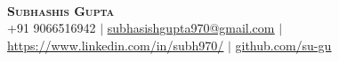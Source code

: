 \documentclass[A4,11pt]{article}
\begin{document}
\begin{comment}
In Europe it is common to include a picture of ones self in the CV. Select
which heading appropriate for the document you are creating.
\end{comment}

\begin{minipage}[c]{0.05\textwidth}
\-\
\end{minipage}
\begin{minipage}[c]{0.2\textwidth}
\hfill\vline\hfill
\end{minipage}


\begin{center}
    \textbf{\Huge \scshape Subhashis Gupta} \\ \vspace{0.5pt} %
    \small +91 9066516942 $|$ 
    \href{mailto:subhasishgupta970@gmail.com}{\underline{subhasishgupta970@gmail.com}} $|$\\
    \href{https://www.linkedin.com/in/subh970/}{\underline{https://www.linkedin.com/in/subh970/}} $|$
    \href{https://github.com/su-gu}{\underline{github.com/su-gu}}
\end{center}
\end{document}
